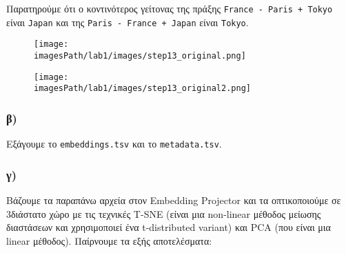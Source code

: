 \documentclass[a4paper, 12pt]{article}
\newcommand{\imagesPath}{.}
\begin{document}
        	Παρατηρούμε ότι ο κοντινότερος γείτονας της πράξης \verb|France - Paris + Tokyo| είναι \verb|Japan| και της \verb|Paris - France + Japan| είναι \verb|Tokyo|.
        
        \begin{figure}[H]
        	\texttt{[image: \\imagesPath/lab1/images/step13\_original.png]}
        \end{figure}
        
        \begin{figure}[H]
        	\texttt{[image: \\imagesPath/lab1/images/step13\_original2.png]}
        \end{figure}
        
        \subsubsection*{β)}
        	Εξάγουμε το \verb|embeddings.tsv| και το \verb|metadata.tsv|.
        
        \subsubsection*{γ)}
        	Βάζουμε τα παραπάνω αρχεία στον Embedding Projector και τα οπτικοποιούμε σε 3διάστατο χώρο με τις  τεχνικές T-SNE (είναι μια non-linear μέθοδος μείωσης διαστάσεων και χρησιμοποιεί ένα t-distributed variant) και PCA (που είναι μια linear μέθοδος). Παίρνουμε τα εξής αποτελέσματα:
        	
\end{document}
